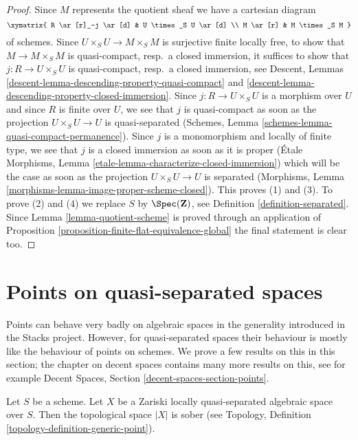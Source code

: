 \begin{proof}
Since $M$ represents the quotient sheaf we have a cartesian diagram
$$
\xymatrix{
R \ar[r]_-j \ar[d] & U \times_S U \ar[d] \\
M \ar[r] & M \times_S M
}
$$
of schemes. Since $U \times_S U \to M \times_S M$ is surjective finite locally
free, to show that $M \to M \times_S M$ is quasi-compact, resp.\ a closed
immersion, it suffices to show that $j : R \to U \times_S U$ is
quasi-compact, resp.\ a closed immersion, see
Descent, Lemmas \ref{descent-lemma-descending-property-quasi-compact} and
\ref{descent-lemma-descending-property-closed-immersion}.
Since $j : R \to U \times_S U$ is a morphism over $U$ and since
$R$ is finite over $U$, we see that $j$ is quasi-compact as soon
as the projection $U \times_S U \to U$ is quasi-separated
(Schemes, Lemma \ref{schemes-lemma-quasi-compact-permanence}).
Since $j$ is a monomorphism and locally of finite type, we see that
$j$ is a closed immersion as soon as it is proper
(\'Etale Morphisms, Lemma \ref{etale-lemma-characterize-closed-immersion})
which will be the case as soon as the projection
$U \times_S U \to U$ is separated
(Morphisms, Lemma \ref{morphisms-lemma-image-proper-scheme-closed}).
This proves (1) and (3). To prove (2) and (4) we replace $S$ by
$\Spec(\mathbf{Z})$, see Definition \ref{definition-separated}.
Since Lemma \ref{lemma-quotient-scheme} is proved through an application of
Proposition \ref{proposition-finite-flat-equivalence-global}
the final statement is clear too.
\end{proof}




\section{Points on quasi-separated spaces}
\label{section-points-quasi-separated}

\noindent
Points can behave very badly on algebraic spaces in the generality introduced
in the Stacks project. However, for quasi-separated spaces their behaviour
is mostly like the behaviour of points on schemes. We prove a few results
on this in this section; the chapter on decent spaces contains many more
results on this, see for example
Decent Spaces, Section \ref{decent-spaces-section-points}.

\begin{lemma}
\label{lemma-quasi-separated-sober}
Let $S$ be a scheme. Let $X$ be a Zariski locally quasi-separated
algebraic space over $S$. Then the topological space $|X|$ is sober (see
Topology, Definition \ref{topology-definition-generic-point}).
\end{lemma}

